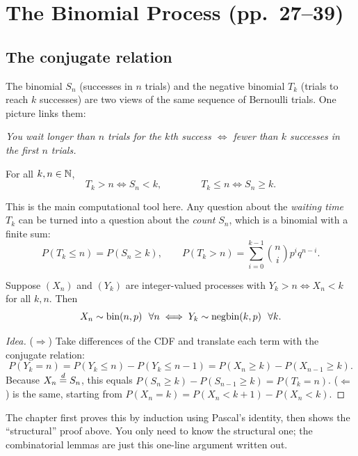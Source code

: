 \section{The Binomial Process (pp.\ 27--39)}

\subsection{The conjugate relation}

The binomial $S_n$ (successes in $n$ trials) and the negative binomial $T_k$ (trials to reach $k$ successes) are two views of the same sequence of Bernoulli trials. One picture links them:

\begin{center}
\emph{You wait longer than $n$ trials for the $k$th success $\iff$ fewer than $k$ successes in the first $n$ trials.}
\end{center}

\begin{proposition}
For all $k, n \in \mathbb{N}$,
\[
T_k > n \iff S_n < k, \qquad\qquad T_k \le n \iff S_n \ge k.
\]
\end{proposition}

\begin{remark}
This is the main computational tool here. Any question about the \emph{waiting time} $T_k$ can be turned into a question about the \emph{count} $S_n$, which is a binomial with a finite sum:
\[
P(T_k \le n) = P(S_n \ge k), \qquad P(T_k > n) = \sum_{i=0}^{k-1}\binom{n}{i}p^iq^{n-i}.
\]
\end{remark}

\begin{proposition}
Suppose $(X_n)$ and $(Y_k)$ are integer-valued processes with $Y_k > n \iff X_n < k$ for all $k,n$. Then
\[
X_n \sim \operatorname{bin}(n,p)\ \ \forall n \iff Y_k \sim \operatorname{negbin}(k,p)\ \ \forall k.
\]
\end{proposition}
\begin{proof}[Idea]
($\Rightarrow$) Take differences of the CDF and translate each term with the conjugate relation:
\[
P(Y_k = n) = P(Y_k \le n) - P(Y_k \le n-1) = P(X_n \ge k) - P(X_{n-1} \ge k).
\]
Because $X_n \overset{d}{=} S_n$, this equals $P(S_n \ge k) - P(S_{n-1}\ge k) = P(T_k = n)$.
($\Leftarrow$) is the same, starting from $P(X_n = k) = P(X_n < k+1) - P(X_n < k)$.
\end{proof}
\begin{remark}
The chapter first proves this by induction using Pascal's identity, then shows the ``structural'' proof above. You only need to know the structural one; the combinatorial lemmas are just this one-line argument written out.
\end{remark}

